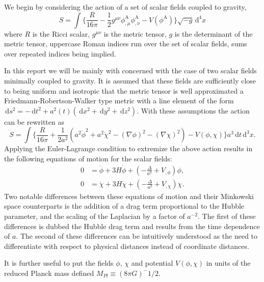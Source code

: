 \documentclass[letterpaper,11pt]{article}
\newcommand{\ud}{\,\mathrm{d}}
\begin{document}



We begin by considering the action of a set of scalar fields coupled to gravity,
\begin{equation}
S=\int \Big\{ \frac{R}{16\pi} - \frac{1}{2}g^{\mu \nu} \phi_{,\mu}^{\mathrm{A}} \phi_{,\nu}^{\mathrm{A}}-V(\phi^{\mathrm{A}}) \Big\} \sqrt{-g}\ud^4x
\end{equation}
where $R$ is the Ricci scalar, $g^{\mu \nu}$ is the metric tensor, $g$ is the determinant of the metric tensor, uppercase Roman indices run over the set of scalar fields, sums over repeated indices being implied. %

In this report we will be mainly with concerned with the case of two scalar fields minimally coupled to gravity. It is assumed that these fields are sufficiently close to being uniform and isotropic that the metric tensor is well approximated a Friedmann-Robertson-Walker type metric with a line element of the form $\ud s^2=-\ud t^2+a^2(t)(\ud x^2+\ud y^2+\ud z^2)$. With these assumptions the action can be rewritten as
\begin{equation}
S=\int \Big\{ \frac{R}{16 \pi}+\frac{1}{2a^2}(a^2 \dot{\phi}^2+a^2\dot{\chi}^2-(\nabla{\phi})^2-(\nabla{\chi})^2)-V(\phi,\chi) \Big\}a^3\ud t\ud^3x.
\end{equation}
Applying the Euler-Lagrange condition to extremize the above action results in the following equations of motion for the scalar fields:
\begin{align}
0&=\ddot{\phi}+3H\dot{\phi}+(-\frac{\Delta}{a^2}+V_{,\phi})\phi,\\
0&=\ddot{\chi}+3H\dot{\chi}+(-\frac{\Delta}{a^2}+V_{,\chi})\chi.
\end{align}
Two notable differences between these equations of motion and their Minkowski space counterparts is the addition of a drag term proportional to the Hubble parameter, and the scaling of the Laplacian by a factor of $a^{-2}$. The first of these differences is dubbed the Hubble drag term and results from the time dependence of $a$. The second of these differences can be intuitively understood as the need to differentiate with respect to physical distances instead of coordinate distances.

It is further useful to put the fields $\phi$, $\chi$ and potential $V(\phi ,\chi )$ in units of the reduced Planck mass defined $M_{Pl} \equiv (8 \pi G)^-{1/2}$. 
\end{document}
